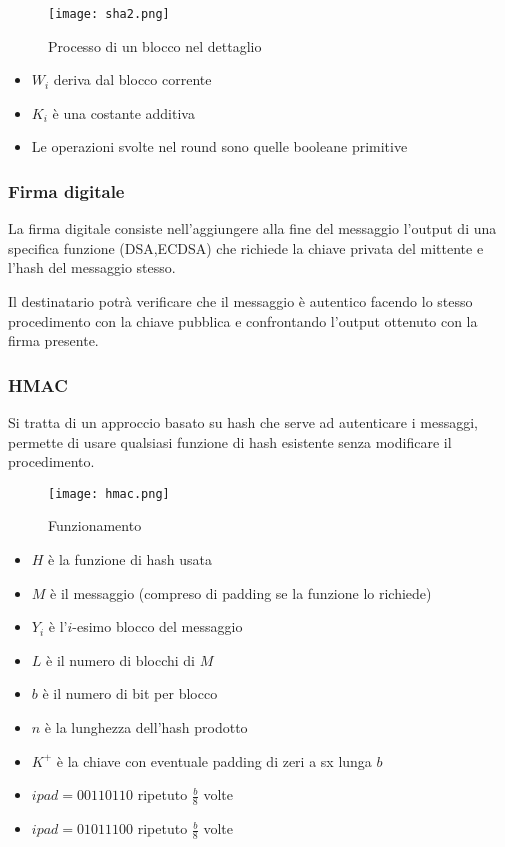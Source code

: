 \documentclass{article}
\begin{document}
\newpage

\begin{figure}[H]
    \centering
    \texttt{[image: sha2.png]}
    \caption{Processo di un blocco nel dettaglio}
\end{figure}

\vspace{3pt}

\begin{itemize}
    \item $W_i$ deriva dal blocco corrente
    \item $K_i$ è una costante additiva
    \item Le operazioni svolte nel round sono quelle booleane primitive\newline
\end{itemize}

\subsubsection{Firma digitale}

La firma digitale consiste nell'aggiungere alla fine del messaggio l'output di una specifica funzione (DSA,ECDSA) che richiede la chiave privata del mittente e l'hash del messaggio stesso.\newline

\noindent Il destinatario potrà verificare che il messaggio è autentico facendo lo stesso procedimento con la chiave pubblica e confrontando l'output ottenuto con la firma presente.

\newpage

\subsubsection{HMAC}

Si tratta di un approccio basato su hash che serve ad autenticare i messaggi, permette di usare qualsiasi funzione di hash esistente senza modificare il procedimento.

\begin{figure}[ht]
    \centering
    \texttt{[image: hmac.png]}
    \caption{Funzionamento}
\end{figure}

\begin{itemize}
    \item $H$ è la funzione di hash usata
    \item $M$ è il messaggio (compreso di padding se la funzione lo richiede)
    \item $Y_i$ è l'$i$-esimo blocco del messaggio
    \item $L$ è il numero di blocchi di $M$
    \item $b$ è il numero di bit per blocco
    \item $n$ è la lunghezza dell'hash prodotto
    \item $K^+$ è la chiave con eventuale padding di zeri a sx lunga $b$
    \item $ipad=00110110$ ripetuto $\frac{b}{8}$ volte
    \item $ipad=01011100$ ripetuto $\frac{b}{8}$ volte
\end{itemize}
\end{document}
